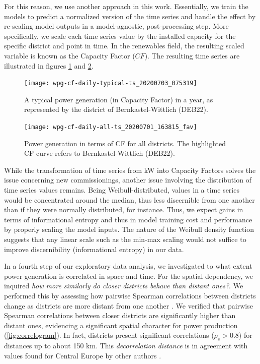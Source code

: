 For this reason, we use another approach in this work.
Essentially, we train the models to predict a normalized version of the time series and handle the effect by re-scaling model outputs in a model-agnostic, post-processing step.
More specifically, we scale each time series value by the installed capacity for the specific district and point in time.
In the renewables field, the resulting scaled variable is known as the Capacity Factor ($CF$).
The resulting time series are illustrated in figures \ref{fig:deb22_production_2015_cf} and \ref{fig:all_cf}.

\begin{figure}[H]%
	\centering
    \caption{A typical power generation (in Capacity Factor) in a year, as represented by the district of Bernkastel-Wittlich (DEB22).}
    \texttt{[image: wpg-cf-daily-typical-ts\_20200703\_075319]}
	\label{fig:deb22_production_2015_cf}
\end{figure}

\begin{figure}[H]%
	\centering
    \caption{Power generation in terms of CF for all districts. The highlighted CF curve refers to Bernkastel-Wittlich (DEB22).}
    \texttt{[image: wpg-cf-daily-all-ts\_20200701\_163815\_fav]}
	\label{fig:all_cf}
\end{figure}

While the transformation of time series from kW into Capacity Factors solves the issue concerning new commissionings, another issue involving the distribution of time series values remains.
Being Weibull-distributed, values in a time series would be concentrated around the median, thus less discernible from one another than if they were normally distributed, for instance.
Thus, we expect gains in terms of informational entropy and thus in model training cost and performance by properly scaling the model inputs.
The nature of the Weibull density function suggests that any linear scale such as the min-max scaling would not suffice to improve discernibility (informational entropy) in our data.

In a fourth step of our exploratory data analysis, we investigated to what extent power generation is correlated in space and time.
For the spatial dependency, we inquired \textit{how more similarly do closer districts behave than distant ones?}.
We performed this by assessing how pairwise Spearman correlations between districts change as districts are more distant from one another \cite{engeland2017variability}.
We verified that pairwise Spearman correlations between closer districts are significantly higher than distant ones, evidencing a significant spatial character for power production (\ref{fig:correlogram}).
In fact, districts present significant correlations ($\rho_s>0.8$) for distances up to about 150 km.
This \textit{decorrelation distance} is in agreement with values found for Central Europe by other authors \cite{engeland2017variability}.

